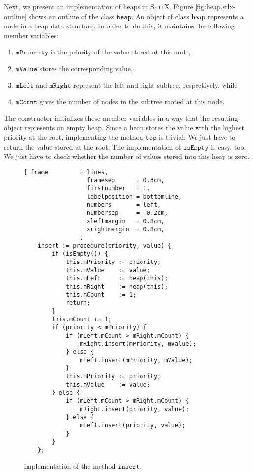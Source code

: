 \noindent
Next, we present an implementation of heaps in \textsc{SetlX}. 
Figure \ref{fig:heap.stlx-outline} shows an outline of the class $\mathtt{heap}$.  An object of class
heap represents a node in a heap data structure. In order to do this, it maintains the following
member variables:
\begin{enumerate}
\item $\mathtt{mPriority}$ is the priority of the value stored at this node,
\item $\mathtt{mValue}$    stores the corresponding value,
\item $\mathtt{mLeft}$ and $\mathtt{mRight}$ represent the left and right subtree, respectively, while
\item $\mathtt{mCount}$    gives the number of nodes in the subtree rooted at this node.
\end{enumerate}
The constructor initializes these member variables in a way that the resulting object represents an
empty heap.  Since a heap stores the value with the highest priority at the root, implementing the
method $\mathtt{top}$ is trivial: We just have to return the value stored at the root.
The implementation of $\mathtt{isEmpty}$ is easy, too: We just have to check whether the number of
values stored into this heap is zero.
\begin{figure}[!ht]
\centering
\begin{Verbatim}[ frame         = lines, 
                  framesep      = 0.3cm, 
                  firstnumber   = 1,
                  labelposition = bottomline,
                  numbers       = left,
                  numbersep     = -0.2cm,
                  xleftmargin   = 0.8cm,
                  xrightmargin  = 0.8cm,
                ]
    insert := procedure(priority, value) {
        if (isEmpty()) {
            this.mPriority := priority;
            this.mValue    := value;
            this.mLeft     := heap(this);
            this.mRight    := heap(this);
            this.mCount    := 1;
            return;
        }
        this.mCount += 1;
        if (priority < mPriority) {                         
            if (mLeft.mCount > mRight.mCount) {
                mRight.insert(mPriority, mValue);
            } else {
                mLeft.insert(mPriority, mValue);
            }
            this.mPriority := priority;
            this.mValue    := value;
        } else {
            if (mLeft.mCount > mRight.mCount) { 
                mRight.insert(priority, value);
            } else {
                mLeft.insert(priority, value);
            }
        }
    };
\end{Verbatim}
\vspace*{-0.3cm}
\caption{Implementation of the method $\mathtt{insert}$.}
\label{fig:heap.stlx-insert}
\end{figure}

